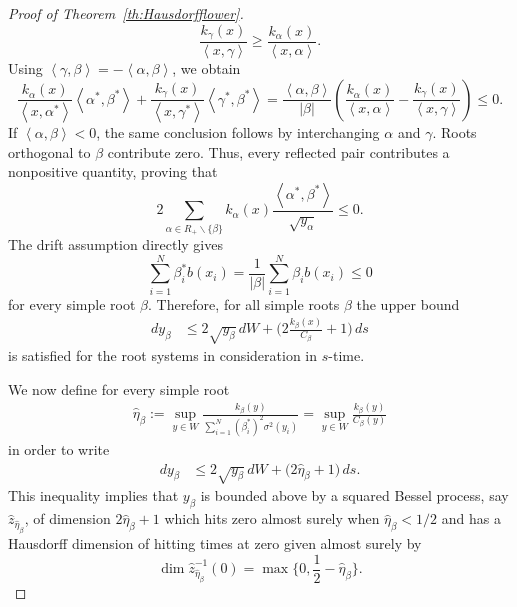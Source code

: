 \documentclass{article}
\numberwithin{equation}{section}
\newcommand{\inner}[2]{\left<#1,#2\right>}
\newcommand{\aR}{\alpha\in R_+}
\newcommand{\SaRnb}{\sum_{\aR\backslash\{\beta\}}}
\newcommand{\Sni}{\sum_{i=1}^N}
\theoremstyle{plain}
\begin{document}
\begin{proof}[Proof of Theorem~\ref{th:Hausdorfflower}]
            \begin{equation*}
                \frac{k_\gamma(x)}{\inner{x}{\gamma}} \geq \frac{k_\alpha(x)}{\inner{x}{\alpha}}.
            \end{equation*}
        Using $\inner{\gamma}{\beta}=-\inner{\alpha}{\beta}$, we obtain
            \begin{equation*}
                \frac{k_\alpha(x)}{\inner{x}{\alpha^*}} \inner{\alpha^*}{\beta^*} +\frac{k_\gamma(x)}{\inner{x}{\gamma^*}} \inner{\gamma^*}{\beta^*} 
                     = \frac{\inner{\alpha}{\beta}}{|\beta|} \left(\frac{k_\alpha(x)}{\inner{x}{\alpha}}-\frac{k_\gamma(x)}{\inner{x}{\gamma}}\right) \leq 0.
            \end{equation*}
        If $\inner{\alpha}{\beta}<0$, the same conclusion follows by interchanging $\alpha$ and $\gamma$. Roots orthogonal to $\beta$ contribute zero. Thus, every reflected pair contributes a nonpositive quantity, proving that
            \begin{equation*}
                2\SaRnb k_\alpha(x)\frac{\inner{\alpha^*}{\beta^*}}{\sqrt{y_\alpha}}\leq 0.
            \end{equation*}
        The drift assumption directly gives
        \[
        \sum_{i=1}^N\beta_i^*b(x_i)
        =\frac1{|\beta|}\sum_{i=1}^N\beta_i b(x_i)\leq0
        \]
        for every simple root $\beta$. Therefore, for all simple roots $\beta$ the upper bound
        \begin{align*}
            dy_\beta &\leq 2\sqrt{y_\beta}\, dW+\bigg(2\frac{k_\beta(x)}{C_\beta}+1\bigg)\,ds
        \end{align*}
        is satisfied for the root systems in consideration in $s$-time.
        
        We now define for every simple root
        \begin{align}
            \hat\eta_\beta:=\sup_{y\in W}\frac{k_\beta(y)}{\Sni(\beta_i^*)^2\sigma^2(y_i)}=\sup_{y\in W}\frac{k_\beta(y)}{C_\beta(y)}\label{eq:etahat}
        \end{align}
        in order to write
        \begin{align*}
            dy_\beta &\leq 2\sqrt{y_\beta}\, dW+\bigg(2\hat{\eta}_\beta+1\bigg)\,ds.
        \end{align*}
        This inequality implies that $y_\beta$ is bounded above by a squared Bessel process, say $\hat z_{\hat{\eta}_\beta}$, of dimension $2\hat{\eta}_\beta+1$ which hits zero almost surely when $\hat{\eta}_\beta<1/2$ and has a Hausdorff dimension of hitting times at zero given almost surely by \cite{GoeingJaeshckeYor03,LiuXiao98}
        \[\dim \hat z_{\hat{\eta}_\beta}^{-1}(0) = \max\Big\{0,\frac12-\hat{\eta}_\beta\Big\}.\]
        

\end{proof}
\end{document}
